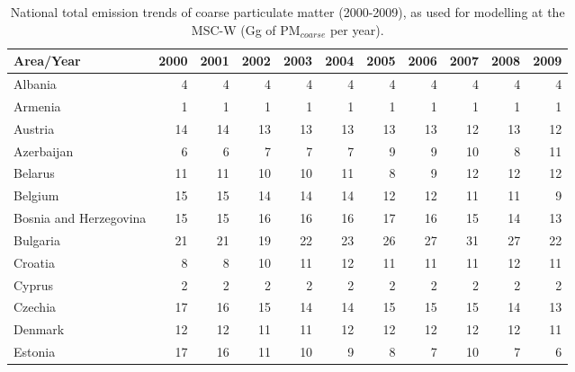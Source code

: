  
 \begin{table}
 \caption{National total emission trends of coarse particulate matter (2000-2009), as used for modelling at the MSC-W (Gg of PM$_{coarse}$ per year).}
 
 \vspace{15pt}
 
 \scriptsize
 \centering
 \begin{tabular}{|l|r|r|r|r|r|r|r|r|r|r|}
 \hline
                     Area/Year&   2000&   2001&   2002&   2003&   2004&   2005&   2006&   2007&   2008&   2009\\\hline\hline
                       Albania&      4&      4&      4&      4&      4&      4&      4&      4&      4&      4\\\hline
                       Armenia&      1&      1&      1&      1&      1&      1&      1&      1&      1&      1\\\hline
                       Austria&     14&     14&     13&     13&     13&     13&     13&     12&     13&     12\\\hline
                    Azerbaijan&      6&      6&      7&      7&      7&      9&      9&     10&      8&     11\\\hline
                       Belarus&     11&     11&     10&     10&     11&      8&      9&     12&     12&     12\\\hline
                       Belgium&     15&     15&     14&     14&     14&     12&     12&     11&     11&      9\\\hline
        Bosnia and Herzegovina&     15&     15&     16&     16&     16&     17&     16&     15&     14&     13\\\hline
                      Bulgaria&     21&     21&     19&     22&     23&     26&     27&     31&     27&     22\\\hline
                       Croatia&      8&      8&     10&     11&     12&     11&     11&     11&     12&     11\\\hline
                        Cyprus&      2&      2&      2&      2&      2&      2&      2&      2&      2&      2\\\hline
                       Czechia&     17&     16&     15&     14&     14&     15&     15&     15&     14&     13\\\hline
                       Denmark&     12&     12&     11&     11&     12&     12&     12&     12&     12&     11\\\hline
                       Estonia&     17&     16&     11&     10&      9&      8&      7&     10&      7&      6\\\hline

\end{tabular}
\end{table}

